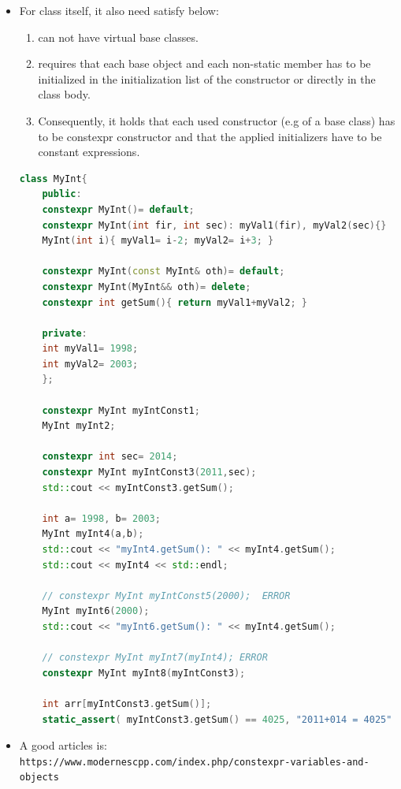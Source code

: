 \documentclass[a4paper,11pt,twoside]{book}
\begin{document}
\begin{itemize}
	\item For class itself, it also need satisfy below:
	\begin{enumerate}
		\item can not have virtual base classes.
		\item requires that each base object and each non-static member has to be initialized in the initialization list of the constructor or directly in the class body. 
		\item Consequently, it holds that each used constructor (e.g of a base class) has to be constexpr constructor and that the applied initializers have to be constant expressions.
	\end{enumerate}
	\begin{lstlisting}[frame=single, language=c++]
	class MyInt{
	public:
	constexpr MyInt()= default;
	constexpr MyInt(int fir, int sec): myVal1(fir), myVal2(sec){}
	MyInt(int i){ myVal1= i-2; myVal2= i+3; }
	
	constexpr MyInt(const MyInt& oth)= default;
	constexpr MyInt(MyInt&& oth)= delete;
	constexpr int getSum(){ return myVal1+myVal2; }
	
	private:
	int myVal1= 1998;
	int myVal2= 2003;
	};
	
	constexpr MyInt myIntConst1;
	MyInt myInt2;
	
	constexpr int sec= 2014;
	constexpr MyInt myIntConst3(2011,sec);
	std::cout << myIntConst3.getSum();
	
	int a= 1998, b= 2003;
	MyInt myInt4(a,b);
	std::cout << "myInt4.getSum(): " << myInt4.getSum();
	std::cout << myInt4 << std::endl;
	
	// constexpr MyInt myIntConst5(2000);  ERROR
	MyInt myInt6(2000);
	std::cout << "myInt6.getSum(): " << myInt4.getSum();
	
	// constexpr MyInt myInt7(myInt4); ERROR
	constexpr MyInt myInt8(myIntConst3);
	
	int arr[myIntConst3.getSum()];
	static_assert( myIntConst3.getSum() == 4025, "2011+014 = 4025" );
	\end{lstlisting}
	
	\item A good articles is: \\ \verb|https://www.modernescpp.com/index.php/constexpr-variables-and-objects|
	
\end{itemize}
\end{document}

